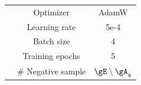 \begin{table}[]
\begin{tabular}{@{}ccc@{}}
& Optimizer               & AdamW                \\
                                       & Learning rate            & 5e-4             \\
                                       & Batch size               & 4                    \\
                                       & Training epochs          & 5                    \\
                                       & \# Negative sample        & $\gE\setminus \gA_q$ \\ \bottomrule
\end{tabular}%
\end{table}